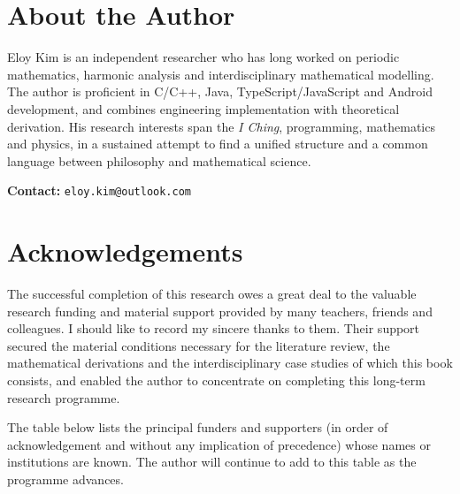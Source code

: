 \cleardoublepage
{}
{}
\chapter*{About the Author}

Eloy Kim is an independent researcher who has long worked on periodic mathematics, harmonic analysis and interdisciplinary mathematical modelling. The author is proficient in C/C++, Java, TypeScript/JavaScript and Android development, and combines engineering implementation with theoretical derivation. His research interests span the \textit{I Ching}, programming, mathematics and physics, in a sustained attempt to find a unified structure and a common language between philosophy and mathematical science.

\vspace{1em}
\noindent\textbf{Contact:} \texttt{eloy.kim@outlook.com}

\cleardoublepage
{}
{}
\chapter*{Acknowledgements}

The successful completion of this research owes a great deal to the valuable research funding and material support provided by many teachers, friends and colleagues. I should like to record my sincere thanks to them. Their support secured the material conditions necessary for the literature review, the mathematical derivations and the interdisciplinary case studies of which this book consists, and enabled the author to concentrate on completing this long-term research programme.

The table below lists the principal funders and supporters (in order of acknowledgement and without any implication of precedence) whose names or institutions are known. The author will continue to add to this table as the programme advances.

